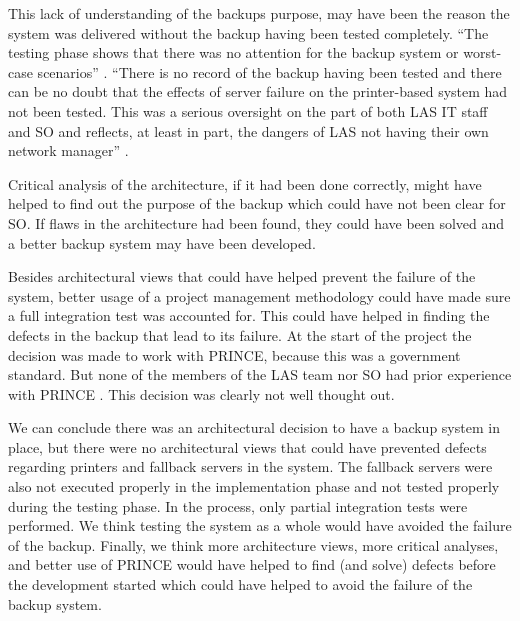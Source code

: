 This lack of understanding of the backups purpose, may have been the reason the system was delivered without the backup having been tested completely.
``The testing phase shows that there was no attention for the backup system or worst-case scenarios'' \autocite[3085,3132]{officialreport}.
``There is no record of the backup having been tested and there can be no doubt that the effects of server failure on the printer-based system had not been tested.
This was a serious oversight on the part of both LAS IT staff and SO and reflects, at least in part, the dangers of LAS not having their own network manager'' \autocite[4041]{officialreport}.

Critical analysis of the architecture, if it had been done correctly, might have helped to find out the purpose of the backup which could have not been clear for SO.
If flaws in the architecture had been found, they could have been solved and a better backup system may have been developed.

Besides architectural views that could have helped prevent the failure of the system, better usage of a project management methodology could have made sure a full integration test was accounted for.
This could have helped in finding the defects in the backup that lead to its failure.
At the start of the project the decision was made to work with PRINCE, because this was a government standard.
But none of the members of the LAS team nor SO had prior experience with PRINCE \autocite[3068,3078]{officialreport}.
This decision was clearly not well thought out.

We can conclude there was an architectural decision to have a backup system in place,
but there were no architectural views that could have prevented defects regarding printers and fallback servers in the system.
The fallback servers were also not executed properly in the implementation phase and not tested properly during the testing phase.
In the process, only partial integration tests were performed.
We think testing the system as a whole would have avoided the failure of the backup.
Finally, we think more architecture views, more critical analyses,
and better use of PRINCE would have helped to find (and solve) defects before the development started which could have helped to avoid the failure of the backup system.